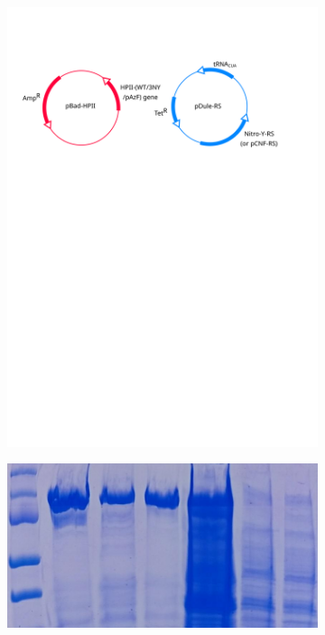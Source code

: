 \documentclass[journal=jacsat,manuscript=article]{achemso}
\begin{document}
\begin{figure}[h!]
\begin{subfigure}{0.49\textwidth}
    \begin{minipage}{0.9\textwidth}\includegraphics[width=0.9\linewidth]{figures/plasmid-diagram}\end{minipage}
  \end{subfigure}
  \vspace{2mm}
  \begin{subfigure}{\textwidth}
    \centering
    \begin{minipage}{0.1\textwidth}\caption{}\end{minipage}%
    \begin{minipage}{0.9\textwidth}\centering\includegraphics[width=0.7\linewidth]{figures/pure-gel}\end{minipage}

\end{subfigure}
\end{figure}
\end{document}
